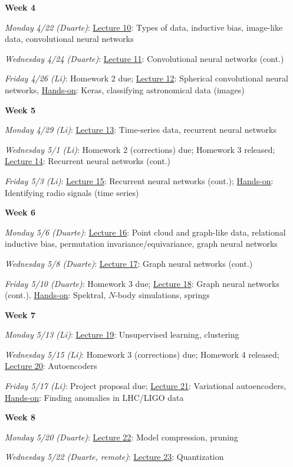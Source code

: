 \documentclass[12pt]{article}
\begin{document}
\noindent\textbf{Week 4}

\emph{Monday 4/22 (Duarte)}: \underline{Lecture 10}: Types of data, inductive bias, image-like data, convolutional neural networks

\emph{Wednesday 4/24 (Duarte)}: \underline{Lecture 11}: Convolutional neural networks (cont.)

\emph{Friday 4/26 (Li)}: Homework 2 due; \underline{Lecture 12}: Spherical convolutional neural networks, \underline{Hands-on}: Keras, classifying astronomical data (images)

\noindent\textbf{Week 5}

\emph{Monday 4/29 (Li)}: \underline{Lecture 13}: Time-series data, recurrent neural networks

\emph{Wednesday 5/1 (Li)}: Homework 2 (corrections) due; Homework 3 released; \underline{Lecture 14}: Recurrent neural networks (cont.)

\emph{Friday 5/3 (Li)}: \underline{Lecture 15}: Recurrent neural networks (cont.); \underline{Hands-on}: Identifying radio signals (time series)

\noindent\textbf{Week 6}

\emph{Monday 5/6 (Duarte)}: \underline{Lecture 16}: Point cloud and graph-like data, relational inductive bias, permutation invariance/equivariance, graph neural networks

\emph{Wednesday 5/8 (Duarte)}: \underline{Lecture 17}: Graph neural networks (cont.)

\emph{Friday 5/10 (Duarte)}: Homework 3 due; \underline{Lecture 18}: Graph neural networks (cont.), \underline{Hands-on}: Spektral, $N$-body simulations, springs

\noindent\textbf{Week 7}

\emph{Monday 5/13 (Li)}: \underline{Lecture 19}: Unsupervised learning, clustering

\emph{Wednesday 5/15 (Li)}: Homework 3 (corrections) due; Homework 4 released; \underline{Lecture 20}: Autoencoders

\emph{Friday 5/17 (Li)}: Project proposal due; \underline{Lecture 21}: Variational autoencoders, \underline{Hands-on}: Finding anomalies in LHC/LIGO data

\noindent\textbf{Week 8}

\emph{Monday 5/20 (Duarte)}: \underline{Lecture 22}: Model compression, pruning

\emph{Wednesday 5/22 (Duarte, remote)}: \underline{Lecture 23}: Quantization
\end{document}
